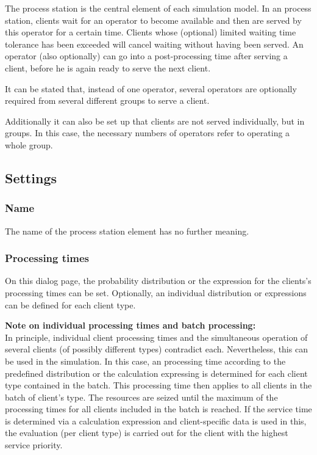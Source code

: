 The process station is the central element of each simulation model. In an process station, clients wait for an operator
to become available and then are served by this operator for a certain time. Clients whose (optional) limited waiting time
tolerance has been exceeded will cancel waiting without having been served. An operator (also optionally) can go into
a post-processing time after serving a client, before he is again ready to serve the next client.

It can be stated that, instead of one operator, several operators are optionally required from several different groups
to serve a client.

Additionally it can also be set up that clients are not served individually, but in groups.
In this case, the necessary numbers of operators refer to operating a whole group.

\subsection*{Settings}

\subsubsection*{Name}

The name of the process station element has no further meaning.

\subsubsection*{Processing times}

On this dialog page, the probability distribution or the expression for the clients's processing times can be set.
Optionally, an individual distribution or expressions can be defined for each client type.

\textbf{Note on individual processing times and batch processing:}~\\
In principle, individual client processing times and the simultaneous operation of several clients
(of possibly different types) contradict each. Nevertheless, this can be used in the simulation.
In this case, an processing time according to the predefined distribution or the calculation expressing
is determined for each client type contained in the batch. This processing time then applies to all clients
in the batch of client's type. The resources are seized until the maximum of the processing times for all
clients included in the batch is reached. If the service time is determined via a calculation expression
and client-specific data is used in this, the evaluation (per client type) is carried out for the client
with the highest service priority.

